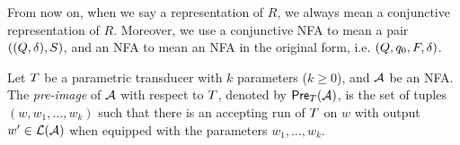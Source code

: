 

From now on, when we say a representation of $R$, we always mean a conjunctive representation of $R$. Moreover, we use a conjunctive NFA to mean a pair $((Q, \delta), S)$, and an NFA to mean an NFA in the original form, i.e. $(Q, q_0, F, \delta)$.

\medskip

Let $T$ be a parametric transducer %
with $k$ parameters ($k\geq 0$), and $\mathcal{A}$ be an NFA. The \emph{pre-image} of $\mathcal{A}$ with respect to $T$, denoted by $\textsf{Pre}_{T}(\mathcal{A})$, is the set of tuples $(w, w_1,\ldots, w_k)$ such that there is an accepting run of $T$ on $w$ with output $w'\in \mathcal{L}(\mathcal{A})$ when equipped with the parameters $w_1,\ldots, w_k$. 


